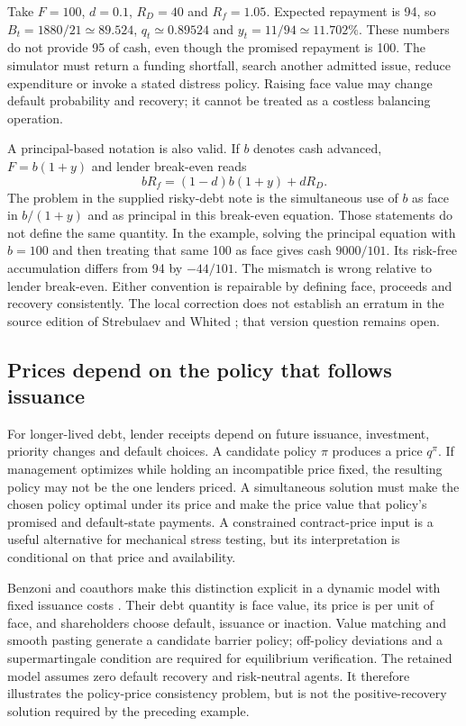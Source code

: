 \documentclass[11pt,a4paper]{article}
\begin{document}
Take $F=100$, $d=0.1$, $R_D=40$ and $R_f=1.05$. Expected repayment is 94,
so $B_t=1880/21\simeq89.524$, $q_t\simeq0.89524$ and
$y_t=11/94\simeq11.702\%$. These numbers do not provide 95 of cash,
even though the promised repayment is 100. The simulator must return a
funding shortfall, search another admitted issue, reduce expenditure or invoke
a stated distress policy. Raising face value may change default probability
and recovery; it cannot be treated as a costless balancing operation.

A principal-based notation is also valid. If $b$ denotes cash advanced,
$F=b(1+y)$ and lender break-even reads
\begin{equation}
bR_f=(1-d)b(1+y)+dR_D.
\end{equation}
The problem in the supplied risky-debt note is the simultaneous use of $b$
as face in $b/(1+y)$ and as principal in this break-even equation. Those
statements do not define the same quantity. In the example, solving the
principal equation with $b=100$ and then treating that same 100 as face
gives cash $9000/101$. Its risk-free accumulation differs from 94 by
$-44/101$. The mismatch is wrong relative to lender break-even. Either
convention is repairable by defining face, proceeds and recovery consistently.
The local correction does not establish an erratum in the source edition of
Strebulaev and Whited \cite{strebulaev}; that version question remains open.

\subsection{Prices depend on the policy that follows issuance}
For longer-lived debt, lender receipts depend on future issuance, investment,
priority changes and default choices. A candidate policy $\pi$ produces a
price $q^\pi$. If management optimizes while holding an incompatible price
fixed, the resulting policy may not be the one lenders priced. A simultaneous
solution must make the chosen policy optimal under its price and make the
price value that policy's promised and default-state payments. A constrained
contract-price input is a useful alternative for mechanical stress testing,
but its interpretation is conditional on that price and availability.

Benzoni and coauthors make this distinction explicit in a dynamic model with
fixed issuance costs \cite[Section~2, Propositions~1--2, Appendix~A]{benzoni}.
Their debt quantity is face value, its price is per unit of face, and
shareholders choose default, issuance or inaction. Value matching and smooth
pasting generate a candidate barrier policy; off-policy deviations and a
supermartingale condition are required for equilibrium verification. The
retained model assumes zero default recovery and risk-neutral agents. It
therefore illustrates the policy-price consistency problem, but is not the
positive-recovery solution required by the preceding example.
\end{document}

